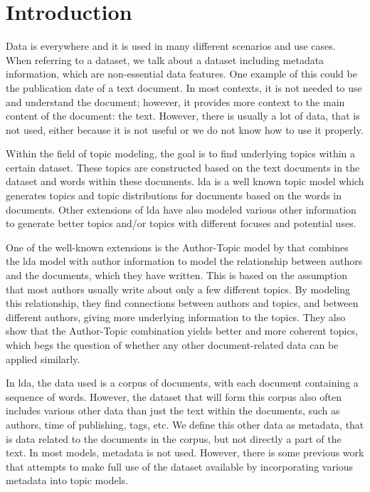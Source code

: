 \section{Introduction}\label{sec:introduction}
Data is everywhere and it is used in many different scenarios and use cases. 
When referring to a dataset, we talk about a dataset including metadata information, which are non-essential data features.
One example of this could be the publication date of a text document. 
In most contexts, it is not needed to use and understand the document; however, it provides more context to the main content of the document: the text.
However, there is usually a lot of data, that is not used, either because it is not useful or we do not know how to use it properly.

Within the field of topic modeling, the goal is to find underlying topics within a certain dataset.
These topics are constructed based on the text documents in the dataset and words within these documents. 
\Gls{lda} is a well known topic model which generates topics and topic distributions for documents based on the words in documents.
Other extensions of \gls{lda} have also modeled various other information to generate better topics and/or topics with different focuses and potential uses.

One of the well-known extensions is the Author-Topic model by \citet{author_topic_2012} that combines the \gls{lda} model with author information to model the relationship between authors and the documents, which they have written.
This is based on the assumption that most authors usually write about only a few different topics.
By modeling this relationship, they find connections between authors and topics, and between different authors, giving more underlying information to the topics.
They also show that the Author-Topic combination yields better and more coherent topics, which begs the question of whether any other document-related data can be applied similarly.

In \gls{lda}, the data used is a corpus of documents, with each document containing a sequence of words.
However, the dataset that will form this corpus also often includes various other data than just the text within the documents, such as authors, time of publishing, tags, etc.
We define this other data as metadata, that is data related to the documents in the corpus, but not directly a part of the text.
In most models, metadata is not used.
However, there is some previous work that attempts to make full use of the dataset available by incorporating various metadata into topic models.

